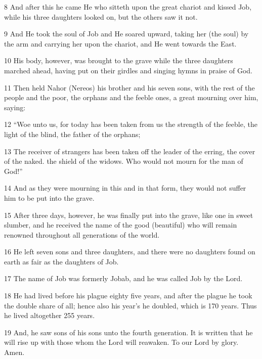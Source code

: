 \par 8 And after this he came He who sitteth upon the great chariot and kissed Job, while his three daughters looked on, but the others saw it not.

\par 9 And He took the soul of Job and He soared upward, taking her (the soul) by the arm and carrying her upon the chariot, and He went towards the East.

\par 10 His body, however, was brought to the grave while the three daughters marched ahead, having put on their girdles and singing hymns in praise of God.

\par 11 Then held Nahor (Nereos) his brother and his seven sons, with the rest of the people and the poor, the orphans and the feeble ones, a great mourning over him, saying:

\par 12 “Woe unto us, for today has been taken from us the strength of the feeble, the light of the blind, the father of the orphans;

\par 13 The receiver of strangers has been taken off the leader of the erring, the cover of the naked. the shield of the widows. Who would not mourn for the man of God!”

\par 14 And as they were mourning in this and in that form, they would not suffer him to be put into the grave.

\par 15 After three days, however, he was finally put into the grave, like one in sweet slumber, and he received the name of the good (beautiful) who will remain renowned throughout all generations of the world.

\par 16 He left seven sons and three daughters, and there were no daughters found on earth as fair as the daughters of Job.

\par 17 The name of Job was formerly Jobab, and he was called Job by the Lord.

\par 18 He had lived before his plague eighty five years, and after the plague he took the double share of all; hence also his year’s he doubled, which is 170 years. Thus he lived altogether 255 years.

\par 19 And, he saw sons of his sons unto the fourth generation. It is written that he will rise up with those whom the Lord will reawaken. To our Lord by glory. Amen.

